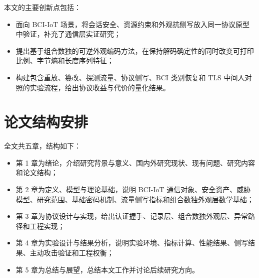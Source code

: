 本文的主要创新点包括：
\begin{itemize}
  \item 面向 BCI-IoT 场景，将会话安全、资源约束和外观抗侧写放入同一协议原型中验证，补充了通信层实证研究；
  \item 提出基于组合数独的可逆外观编码方法，在保持解码确定性的同时改变可打印比例、字节熵和长度序列特征；
  \item 构建包含重放、篡改、探测流量、协议侧写、BCI 类别恢复和 TLS 中间人对照的实验流程，给出协议收益与代价的量化结果。
\end{itemize}

\section{论文结构安排}
全文共五章，结构如下：
\begin{itemize}
  \item 第 1 章为绪论，介绍研究背景与意义、国内外研究现状、现有问题、研究内容和论文结构；
  \item 第 2 章为定义、模型与理论基础，说明 BCI-IoT 通信对象、安全资产、威胁模型、研究范围、基础密码机制、流量侧写指标和组合数独外观层数学基础；
  \item 第 3 章为协议设计与实现，给出认证握手、记录层、组合数独外观层、异常路径和工程实现；
  \item 第 4 章为实验设计与结果分析，说明实验环境、指标计算、性能结果、侧写结果、主动攻击验证和工程权衡；
  \item 第 5 章为总结与展望，总结本文工作并讨论后续研究方向。
\end{itemize}
